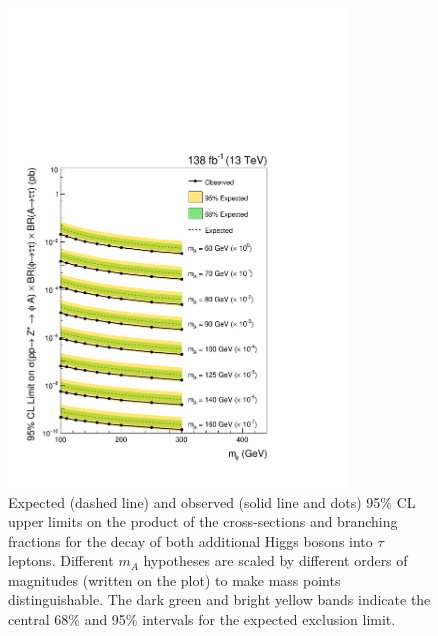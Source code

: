 \begin{figure}[!hbtp]
\centering
    \includegraphics[width=0.8\textwidth]{Figures/model_independent_limit_all.pdf}
\caption[Plot of the model-independent limits on the cross-section of the production from an off-shell Z boson multiplied by the branching fractions of $\phi$ and A to $\tau$ pairs.]{Expected (dashed line) and observed (solid line and dots) 95\% CL upper limits on the product of the cross-sections and branching fractions for the decay of both additional Higgs bosons into $\tau$ leptons. Different $m_{A}$ hypotheses are scaled by different orders of magnitudes (written on the plot) to make mass points distinguishable. The dark green and bright yellow bands indicate the central 68\% and 95\% intervals for the expected exclusion limit.}
\label{fig:4tau_mi}
\end{figure}

